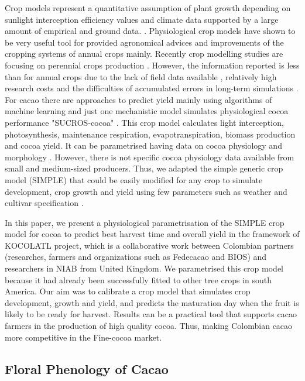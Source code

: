 \documentclass[gene,journal,article,submit,moreauthors,pdftex]{Definitions/mdpi}
\begin{document}
Crop models represent a quantitative assumption of plant growth depending on sunlight interception efficiency values and climate data supported by a large amount of empirical and ground data. \citep{Reynolds2018}. Physiological crop models have shown to be very useful tool for provided agronomical advices and improvements of the cropping systems of annual crops mainly. Recently crop modelling studies are focusing on  perennial crops  production \citep{zuidema2005, Zao2019simple, Bai2020, Romero2021}. However, the information reported  is less than for annual crops due to the lack of field data available , relatively high research costs and the difficulties of accumulated errors in long-term simulations \citep{zuidema2005}. For cacao there are  approaches  to predict yield mainly  using algorithms of machine learning \citep{lamos2020} and just one mechanistic model simulates physiological cocoa performance  "SUCROS-cocoa" \citep{zuidema2005}. This crop model calculates light interception, photosynthesis, maintenance respiration,
evapotranspiration, biomass production and cocoa yield. It can be parametrised having data on cocoa physiology and morphology \citep{zuidema2005}. However,  there is not specific cocoa physiology data available from small and medium-sized producers. Thus, we adapted the simple generic crop model (SIMPLE) that could be easily modified for any crop to simulate development, crop growth and yield using few parameters such as weather and cultivar specification \citep{Zao2019simple}.

In this paper, we present a physiological parametrisation of the SIMPLE crop model \citep{Zao2019simple} for cocoa to predict best harvest time and overall yield in the framework of KOCOLATL project, which is a collaborative work between Colombian partners (researches, farmers and organizations such as Fedecacao and BIOS) and researchers in NIAB from United Kingdom. We parametrised this crop model  because it had already been successfully fitted to other tree crops in south America.  Our aim was to calibrate a crop model that simulates crop development, growth and yield, and predicts the maturation day when the fruit is likely to be ready for harvest. Results can be a practical tool that supports cacao farmers in the production of high quality cocoa. Thus, making Colombian cacao more competitive in the Fine-cocoa market.

\subsection{Floral Phenology of Cacao}
\end{document}
